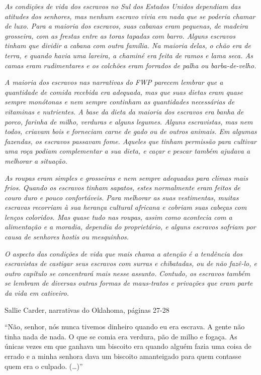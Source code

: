 \emph{As condições de vida dos escravos no Sul dos Estados Unidos
dependiam das atitudes dos senhores, mas nenhum escravo vivia em nada
que se poderia chamar de luxo. Para a maioria dos escravos, suas cabanas
eram pequenas, de madeira grosseira, com as frestas entre as toras
tapadas com barro. Alguns escravos tinham que dividir a cabana com outra
família. Na maioria delas, o chão era de terra, e quando havia uma
lareira, a chaminé era feita de ramos e lama seca. As camas eram
rudimentares e os colchões eram forrados de palha ou barba-de-velho.}

\emph{A maioria dos escravos nas narrativas do FWP parecem lembrar que a
quantidade de comida recebida era adequada, mas que suas dietas eram
quase sempre monótonas e nem sempre continham as quantidades necessárias
de vitaminas e nutrientes. A base da dieta da maioria dos escravos era
banha de porco, farinha de milho, verduras e alguns legumes. Alguns
escravistas, mas nem todos, criavam bois e forneciam carne de gado ou de
outros animais. Em algumas fazendas, os escravos passavam fome. Aqueles
que tinham permissão para cultivar uma roça podiam complementar a sua
dieta, e caçar e pescar também ajudava a melhorar a situação.}

\emph{As roupas eram simples e grosseiras e nem sempre adequadas para
climas mais frios. Quando os escravos tinham sapatos, estes normalmente
eram feitos de couro duro e pouco confortáveis. Para melhorar as suas
vestimentas, muitas escravas recorriam à sua herança cultural africana e
cobriam suas cabeças com lenços coloridos. Mas quase tudo nas roupas,
assim como acontecia com a alimentação e a moradia, dependia do
proprietário, e alguns escravos sofriam por causa de senhores hostis ou
mesquinhos.}

\emph{O aspecto das condições de vida que mais chama a atenção é a
tendência dos escravistas de castigar seus escravos com surras e
chibatadas, ou de não fazê-lo, e outro capítulo se concentrará mais
nesse assunto. Contudo, os escravos também se lembram de diversas outras
formas de maus-tratos e privações que eram parte da vida em cativeiro.}

Sallie Carder, narrativas do Oklahoma, páginas 27-28

``Não, senhor, nós nunca tivemos dinheiro quando eu era escrava. A gente
não tinha nada de nada. O que se comia era verdura, pão de milho e
fogaça. As únicas vezes em que ganhava um biscoito era quando alguém
fazia uma coisa de errado e a minha senhora dava um biscoito amanteigado
para quem contasse quem era o culpado. (\ldots{})''

